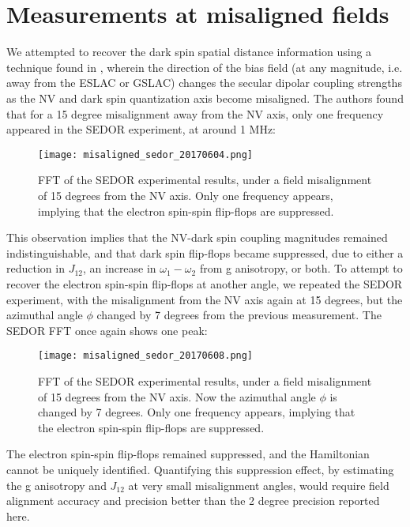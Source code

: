 \documentclass[%
 reprint,
 amsmath,amssymb,
 aps,
]{revtex4-1}
\begin{document}
\section{Measurements at misaligned fields}

We attempted to recover the dark spin spatial distance information using a technique found in \cite{alex single proton}, wherein the direction of the bias field (at any magnitude, i.e. away from the ESLAC or GSLAC) changes the secular dipolar coupling strengths as the NV and dark spin quantization axis become misaligned. The authors found that for a 15 degree misalignment away from the NV axis, only one frequency appeared in the SEDOR experiment, at around 1 MHz: 

\begin{figure}[h!]
\centering
\texttt{[image: misaligned\_sedor\_20170604.png]}
\caption{\label{fig:first_misalign} FFT of the SEDOR experimental results, under a field misalignment of 15 degrees from the NV axis. Only one frequency appears, implying that the electron spin-spin flip-flops are suppressed.}
\end{figure}

This observation implies that the NV-dark spin coupling magnitudes remained indistinguishable, and that dark spin flip-flops became suppressed, due to either a reduction in $J_{12}$, an increase in $\omega_1 - \omega_2$ from g anisotropy, or both. To attempt to recover the electron spin-spin flip-flops at another angle, we repeated the SEDOR experiment, with the misalignment from the NV axis  again at 15 degrees, but the azimuthal angle $\phi$ changed by 7 degrees from the previous measurement. The SEDOR FFT once again shows one peak: 

\begin{figure}[h!]
\centering
\texttt{[image: misaligned\_sedor\_20170608.png]}
\caption{\label{fig:second_misalign} FFT of the SEDOR experimental results, under a field misalignment of 15 degrees from the NV axis. Now the azimuthal angle $\phi$ is changed by 7 degrees. Only one frequency appears, implying that the electron spin-spin flip-flops are suppressed.}
\end{figure}

The electron spin-spin flip-flops remained suppressed, and the Hamiltonian cannot be uniquely identified. Quantifying this suppression effect, by estimating the g anisotropy and $J_{12}$ at very small misalignment angles, would require field alignment accuracy and precision better than the 2 degree precision reported here. 
\end{document}
